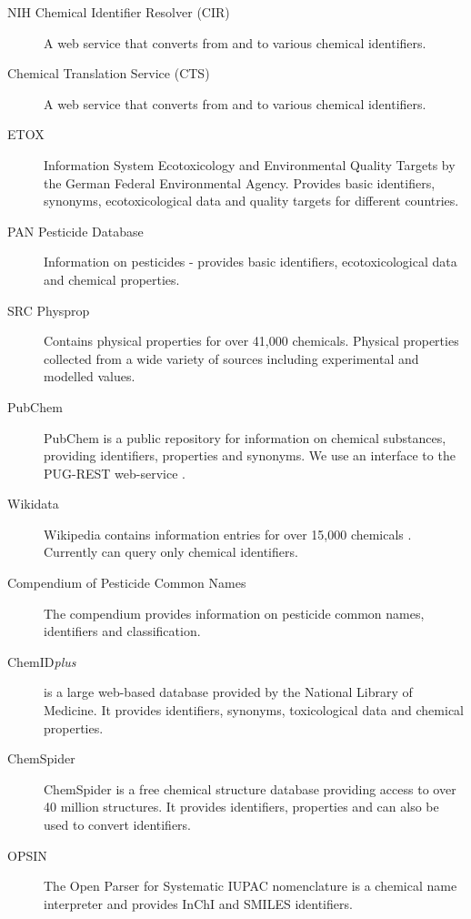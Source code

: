 \documentclass[article, shortnames]{jss}\usepackage[]{graphicx}\usepackage[]{color}
\begin{document}
\begin{description}
  \item[NIH Chemical Identifier Resolver (CIR) \citep{cir}]{A web service that converts from and to various chemical identifiers.}
  \item[Chemical Translation Service (CTS) \citep{Wohlgemuth_Haldiya_Willighagen_Kind_Fiehn_2010}]{A web service that converts from and to various chemical identifiers.}
  \item[ETOX \citep{etox}]{Information System Ecotoxicology and Environmental Quality Targets by the German Federal Environmental Agency. Provides basic identifiers, synonyms, ecotoxicological data and quality targets for different countries.}
  \item[PAN Pesticide Database \citep{pan}]{Information on pesticides - provides basic identifiers, ecotoxicological data and chemical properties.}
  \item[SRC Physprop \citep{physprop}]{Contains physical properties for over 41,000 chemicals.
  Physical properties collected from a wide variety of sources including experimental and modelled values.}
  \item[PubChem \citep{Kim_2016}]{PubChem is a public repository for information on chemical substances, providing identifiers, properties and synonyms.
  We use an interface to the PUG-REST web-service \citep{Kim_Thiessen_Bolton_Bryant_2015}.}
  \item[Wikidata \citep{wiki}]{Wikipedia contains information entries for over 15,000 chemicals \citep{Ertl_Patiny_Sander_Rufener_Zasso_2015}. Currently  can query only chemical identifiers.}
  \item[Compendium of Pesticide Common Names \citep{wood}]{The compendium provides information on pesticide common names, identifiers and classification.}
  \item[ChemID\emph{plus} \citep{Tomasulo_2002}]{is a large web-based database provided by the National Library of Medicine. It provides identifiers, synonyms, toxicological data and chemical properties.}
  \item[ChemSpider \citep{pence_chemspider:_2010}]{ChemSpider is a free chemical structure database providing access to over 40 million structures. It provides identifiers, properties and can also be used to convert identifiers.}
  \item[OPSIN  \citep{Lowe_Corbett_Murray-Rust_Glen_2011}]{The Open Parser for Systematic IUPAC nomenclature is a chemical name interpreter and provides InChI and SMILES identifiers.}
\end{description}
\end{document}
